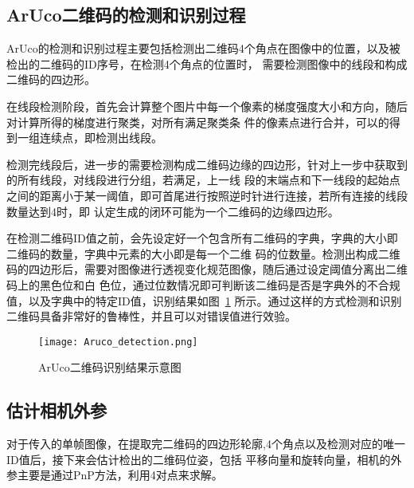 \subsection{ArUco二维码的检测和识别过程}
\label{sec:2.2.2}
ArUco的检测和识别过程主要包括检测出二维码4个角点在图像中的位置，以及被检出的二维码的ID序号，在检测4个角点的位置时，
需要检测图像中的线段和构成二维码的四边形。

在线段检测阶段，首先会计算整个图片中每一个像素的梯度强度大小和方向，随后对计算所得的梯度进行聚类，对所有满足聚类条
件的像素点进行合并，可以的得到一组连续点，即检测出线段。

检测完线段后，进一步的需要检测构成二维码边缘的四边形，针对上一步中获取到的所有线段，对线段进行分组，若满足，上一线
段的末端点和下一线段的起始点之间的距离小于某一阈值，即可首尾进行按照逆时针进行连接，若所有连接的线段数量达到4时，即
认定生成的闭环可能为一个二维码的边缘四边形。

在检测二维码ID值之前，会先设定好一个包含所有二维码的字典，字典的大小即二维码的数量，字典中元素的大小即是每一个二维
码的位数量。检测出构成二维码的四边形后，需要对图像进行透视变化规范图像，随后通过设定阈值分离出二维码上的黑色位和白
色位，通过位数情况即可判断该二维码是否是字典外的不合规值，以及字典中的特定ID值，识别结果如图~\ref{fig:Aruco_detection}
所示。通过这样的方式检测和识别二维码具备非常好的鲁棒性，并且可以对错误值进行效验。
\begin{figure}[H] %
  \centering
  \texttt{[image: Aruco\_detection.png]}
  \caption{ArUco二维码识别结果示意图}
  \label{fig:Aruco_detection}
\end{figure}

\subsection{估计相机外参}
\label{sec:2.2.3}
对于传入的单帧图像，在提取完二维码的四边形轮廓,4个角点以及检测对应的唯一ID值后，接下来会估计检出的二维码位姿，包括
平移向量和旋转向量，相机的外参主要是通过PnP方法，利用4对点来求解。

